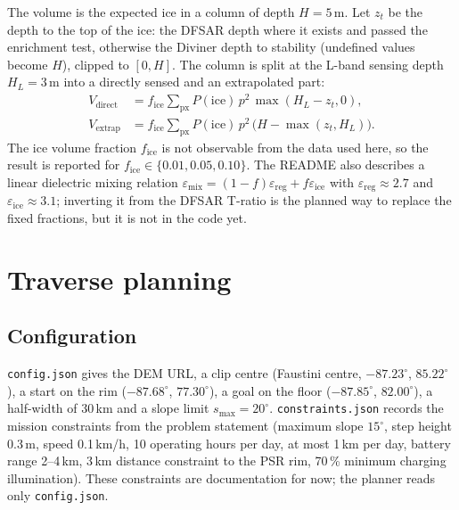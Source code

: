 \documentclass[11pt,a4paper]{article}
\newcommand{\code}[1]{\texttt{#1}}
\newcommand{\Pice}{P(\text{ice})}
\begin{document}
The volume is the expected ice in a column of depth $H=5$\,m. Let $z_t$ be the depth to the top
of the ice: the DFSAR depth where it exists and passed the enrichment test, otherwise the Diviner
depth to stability (undefined values become $H$), clipped to $[0,H]$. The column is split at the
L-band sensing depth $H_L=3$\,m into a directly sensed and an extrapolated part:
\begin{align}
  V_{\mathrm{direct}} &= f_{\mathrm{ice}}\sum_{\text{px}}\Pice\,p^2\,\max(H_L-z_t,0),\\
  V_{\mathrm{extrap}} &= f_{\mathrm{ice}}\sum_{\text{px}}\Pice\,p^2\,\big(H-\max(z_t,H_L)\big).
\end{align}
The ice volume fraction $f_{\mathrm{ice}}$ is not observable from the data used here, so the
result is reported for $f_{\mathrm{ice}}\in\{0.01,0.05,0.10\}$. The README also describes a
linear dielectric mixing relation
$\varepsilon_{\mathrm{mix}}=(1-f)\varepsilon_{\mathrm{reg}}+f\varepsilon_{\mathrm{ice}}$ with
$\varepsilon_{\mathrm{reg}}\approx2.7$ and $\varepsilon_{\mathrm{ice}}\approx3.1$; inverting it
from the DFSAR T-ratio is the planned way to replace the fixed fractions, but it is not in the
code yet.

\section{Traverse planning}

\subsection{Configuration}
\code{config.json} gives the DEM URL, a clip centre (Faustini centre, $-87.23^\circ$,
$85.22^\circ$), a start on the rim ($-87.68^\circ$, $77.30^\circ$), a goal on the floor
($-87.85^\circ$, $82.00^\circ$), a half-width of 30\,km and a slope limit
$s_{\max}=20^\circ$. \code{constraints.json} records the mission constraints from the problem
statement (maximum slope $15^\circ$, step height 0.3\,m, speed 0.1\,km/h, 10 operating hours per
day, at most 1\,km per day, battery range 2--4\,km, 3\,km distance constraint to the PSR rim, 70\,\%
minimum charging illumination). These constraints are documentation for now; the planner reads
only \code{config.json}.
\end{document}
